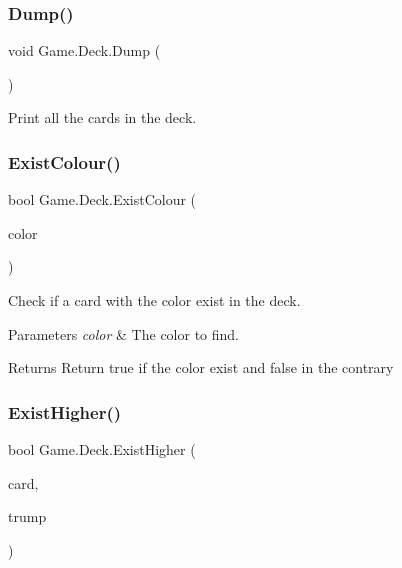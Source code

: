 \subsubsection{\texorpdfstring{Dump()}{Dump()}}
{\footnotesize\ttfamily void Game.\+Deck.\+Dump (\begin{DoxyParamCaption}{ }\end{DoxyParamCaption})\hspace{0.3cm}{\ttfamily [inline]}}

Print all the cards in the deck. \mbox{\label{class_game_1_1_deck_afa33057f343a0c812d061c7b30895727}} 
\subsubsection{\texorpdfstring{Exist\+Colour()}{ExistColour()}}
{\footnotesize\ttfamily bool Game.\+Deck.\+Exist\+Colour (\begin{DoxyParamCaption}\item[{Card\+Colour}]{color }\end{DoxyParamCaption})\hspace{0.3cm}{\ttfamily [inline]}}

Check if a card with the color exist in the deck. 
\begin{DoxyParams}{Parameters}
{\em color} & The color to find. \\
\hline
\end{DoxyParams}
\begin{DoxyReturn}{Returns}
Return true if the color exist and false in the contrary 
\end{DoxyReturn}
\mbox{\label{class_game_1_1_deck_ac66b46d86ce2f0db905bd2c195fc36f5}} 
\subsubsection{\texorpdfstring{Exist\+Higher()}{ExistHigher()}}
{\footnotesize\ttfamily bool Game.\+Deck.\+Exist\+Higher (\begin{DoxyParamCaption}\item[{\hyperlink{class_game_1_1_card}{Card}}]{card,  }\item[{\hyperlink{namespace_game_ae93b4df2175d9820e5d19dc1ab708e7e}{C\+O\+N\+T\+R\+A\+C\+T\+\_\+\+T\+Y\+PE}}]{trump }\end{DoxyParamCaption})\hspace{0.3cm}{\ttfamily [inline]}}

